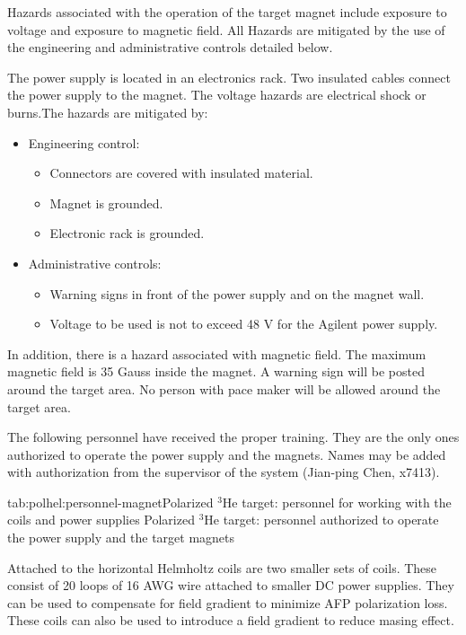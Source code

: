 {Hazards associated with the operation of the target magnet include exposure 
to voltage and exposure to magnetic field. All Hazards are mitigated by the 
use of the engineering and administrative controls detailed below. 

The power supply is located in an electronics rack. Two insulated cables connect the power supply to the magnet. The voltage hazards are electrical shock or 
burns.The hazards are mitigated by:
\begin{itemize}
\item Engineering control:
 \begin{itemize}
 \item Connectors are covered with insulated material.
 \item Magnet is grounded.
 \item Electronic rack is grounded.
 \end{itemize}
\item Administrative controls:
 \begin{itemize}
 \item Warning signs in front of the power supply and on the magnet wall.
 \item Voltage to be used is not to exceed 48 V for the Agilent power supply.
 \end{itemize}
\end{itemize}

In addition, there is a hazard associated with magnetic field. The maximum
magnetic field is 35 Gauss inside the magnet. A warning sign will be posted 
around the target area. No person with pace maker will be allowed around the target area.

The following personnel have received the proper training. They are the only ones authorized to operate the power supply and the magnets. Names may be added with authorization from the supervisor of the system (Jian-ping Chen,  x7413).

\begin{namestab}{tab:polhel:personnel-magnet}{Polarized $^3$He target: personnel for working with the coils and power supplies}{%
   Polarized $^3$He target: personnel authorized to operate the power supply 
and
the target magnets}
   \ChiranjibDutta{}
   \JoeKatich{}
   \YiQiang{}
   \VinceSulkosky{}
   \YiZhang{}
\end{namestab}


Attached to the horizontal Helmholtz coils are two smaller sets of
 coils.  These consist of 20 loops of 16 AWG wire attached to smaller DC
 power supplies.  
They can be used to compensate for field gradient to minimize AFP
polarization loss.
These coils can also be used to introduce a field gradient to reduce 
masing effect.

} %
